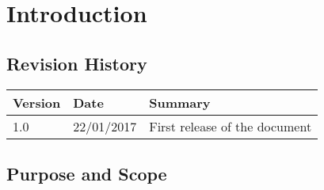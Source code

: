 \documentclass[11pt,a4paper]{report}
\begin{document}


\thispagestyle{empty}
\tableofcontents
\listoffigures
\cleardoublepage
{}
\pagestyle{fancy}

\chapter{Introduction}
\section{Revision History}
\begin{tabularx}{\textwidth}{|l|l|X|}
\hline
Version & Date & Summary\\
\hline
1.0 & 22/01/2017 & First release of the document\\
\hline
\end{tabularx}
\section{Purpose and Scope}
\end{document}
